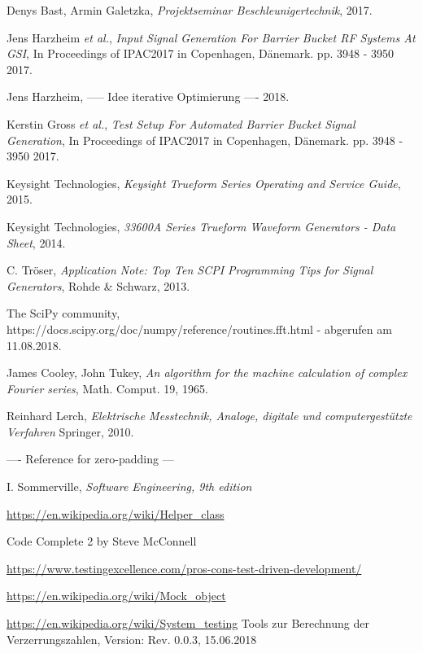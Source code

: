 \documentclass[../Report.tex]{subfiles}
\begin{document}


\begin{thebibliography}{9}

  
	Denys Bast, Armin Galetzka, 
	\textit{Projektseminar Beschleunigertechnik},
	2017.
 
	Jens Harzheim \textit{et al.}, 
	\textit{Input Signal Generation For Barrier Bucket RF Systems At GSI}, In Proceedings of IPAC2017 in Copenhagen, Dänemark. 
	pp. 3948 - 3950
	2017.

	Jens Harzheim,
	----- Idee iterative Optimierung ----
	2018.
	
	Kerstin Gross \textit{et al.},
	\textit{Test Setup For Automated Barrier Bucket Signal Generation},
	In Proceedings of IPAC2017 in Copenhagen, Dänemark. 
	pp. 3948 - 3950
	2017.
	
	Keysight Technologies,
	\textit{Keysight Trueform Series Operating and Service Guide},
	2015.

	Keysight Technologies,
	\textit{33600A Series Trueform Waveform Generators - Data Sheet},
	2014.
	
	C. Tröser, 
	\textit{Application Note: Top Ten SCPI Programming Tips for Signal Generators},
	Rohde \& Schwarz,
	2013.
	
	The SciPy community,
	https://docs.scipy.org/\-doc/numpy/reference/\-routines.fft.html
	- abgerufen am 11.08.2018.
	
	James Cooley, John Tukey,
	\textit{An algorithm for the machine calculation of complex Fourier series},
	Math. Comput. 19,
	1965.
	
	Reinhard Lerch,
	\textit{Elektrische Messtechnik, Analoge, digitale und computergestützte Verfahren}
	Springer,
	2010.

	---- Reference for zero-padding ---

	
	I. Sommerville,
	\textit{Software Engineering, 9th edition}
	
	\url{https://en.wikipedia.org/wiki/Helper_class}
	
	Code Complete 2 by Steve McConnell
	
	\url{https://www.testingexcellence.com/pros-cons-test-driven-development/}
	
	\url{https://en.wikipedia.org/wiki/Mock_object}
	
	\url{https://en.wikipedia.org/wiki/System_testing}	
	Tools zur Berechnung der Verzerrungszahlen, Version: Rev. 0.0.3, 15.06.2018
\end{thebibliography}
\end{document}

